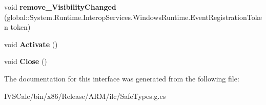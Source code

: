 \begin{DoxyCompactItemize}
void {\bfseries remove\+\_\+\+Visibility\+Changed} (global\+::\+System.\+Runtime.\+Interop\+Services.\+Windows\+Runtime.\+Event\+Registration\+Token token)
\item 
\mbox{\label{interface_windows_1_1_u_i_1_1_xaml_1_1_i_window_abd03eb4d50259c71054881409abc5f8b}} 
void {\bfseries Activate} ()
\item 
\mbox{\label{interface_windows_1_1_u_i_1_1_xaml_1_1_i_window_aab0ec94c2d9d76b4700935c7fcbf6985}} 
void {\bfseries Close} ()
\end{DoxyCompactItemize}


The documentation for this interface was generated from the following file\+:\begin{DoxyCompactItemize}
\item 
I\+V\+S\+Calc/bin/x86/\+Release/\+A\+R\+M/ilc/Safe\+Types.\+g.\+cs\end{DoxyCompactItemize}
